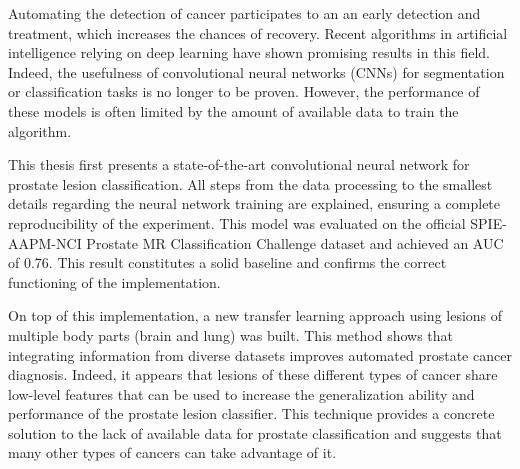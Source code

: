 Automating the detection of cancer participates to an an early detection and treatment, which increases the chances of recovery. Recent algorithms in artificial intelligence relying on deep learning have shown promising results in this field. Indeed, the usefulness of convolutional neural networks (CNNs) for segmentation or classification tasks is no longer to be proven. However, the performance of these models is often limited by the amount of available data to train the algorithm.

This thesis first presents a state-of-the-art convolutional neural network for pro\-state lesion classification. All steps from the data processing to the smallest details regarding the neural network training are explained, ensuring a complete reproducibility of the experiment. This model was evaluated on the official SPIE-AAPM-NCI Prostate MR Classification Challenge dataset and achieved an AUC of 0.76. This result constitutes a solid baseline and confirms the correct functioning of the implementation.

On top of this implementation, a new transfer learning approach using lesions of multiple body parts (brain and lung) was built. This method shows that integrating information from diverse datasets improves automated prostate cancer diagnosis. Indeed, it appears that lesions of these different types of cancer share low-level features that can be used to increase the generalization ability and performance of the prostate lesion classifier. This technique provides a concrete solution to the lack of available data for prostate classification and suggests that many other types of cancers can take advantage of it.
